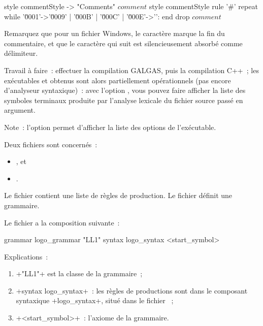 \begin{galgas}
style commentStyle -> "Comments"
$comment$ style commentStyle %
rule '#' {
  repeat
  while '\u0001'->'\u0009' | '\u000B' | '\u000C' | '\u000E'->'\uFFFD':
  end
  drop $comment$
}
\end{galgas}

Remarquez que pour un fichier Windows, le caractère  marque la fin du commentaire, et que le caractère  qui suit est silencieusement absorbé comme délimiteur.

Travail à faire~: effectuer la compilation GALGAS, puis la compilation C++~; les exécutables  et  obtenus sont alors partiellement opérationnels (pas encore d’analyseur syntaxique)~: avec l'option , vous pouvez faire afficher la liste des symboles terminaux produite par l'analyse lexicale du fichier source passé en argument.

Note~: l'option  permet d'afficher la liste des options de l'exécutable. 


Deux fichiers sont concernés~:
\begin{itemize}
  \item {}, et
  \item {}.
\end{itemize}

Le fichier  contient une liste de règles de production. Le fichier  définit une grammaire.

Le fichier  a la composition suivante~:

\begin{galgas}
grammar logo_grammar "LL1" {
  syntax logo_syntax
  <start_symbol>
}
\end{galgas}

Explications~:
\begin{enumerate}
  \item \ggs+"LL1"+ est la classe de la grammaire~;
  \item \ggs+syntax logo_syntax+~: les règles de productions sont dans le composant syntaxique \ggs+logo_syntax+, situé dans le fichier ~; 
  \item \ggs+<start_symbol>+~: l'axiome de la grammaire.
\end{enumerate}

